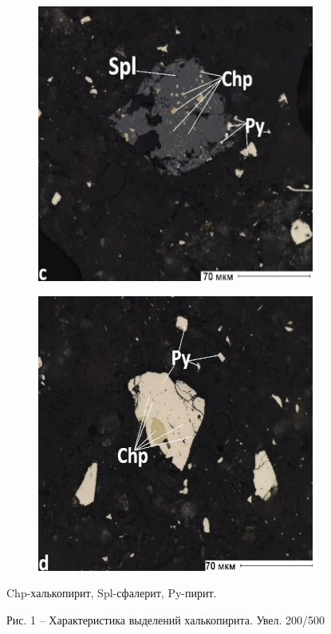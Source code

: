 \begin{figure}[H]
\begin{subfigure}[b]{0.45\textwidth}
    \end{subfigure}
    \begin{subfigure}[b]{0.45\textwidth}
        \centering
        \includegraphics[width=\textwidth]{assets/298}
    \end{subfigure}
    \begin{subfigure}[b]{0.45\textwidth}
        \centering
        \includegraphics[width=\textwidth]{assets/299}
    \end{subfigure}
    \caption*{\normalfont Chp-халькопирит, Spl-сфалерит, Py-пирит.}
    \caption*{Рис. 1 -- Характеристика выделений халькопирита. Увел. 200/500}
\end{figure}

